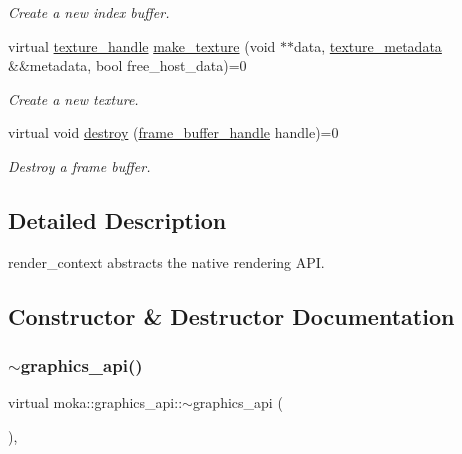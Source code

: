\begin{DoxyCompactItemize}
\begin{DoxyCompactList}\small\item\em Create a new index buffer. \end{DoxyCompactList}\item 
virtual \mbox{\hyperlink{structmoka_1_1texture__handle}{texture\+\_\+handle}} \mbox{\hyperlink{classmoka_1_1graphics__api_a61417bde89d91f8ec436e54226339b88}{make\+\_\+texture}} (void $\ast$$\ast$data, \mbox{\hyperlink{structmoka_1_1texture__metadata}{texture\+\_\+metadata}} \&\&metadata, bool free\+\_\+host\+\_\+data)=0
\begin{DoxyCompactList}\small\item\em Create a new texture. \end{DoxyCompactList}\item 
virtual void \mbox{\hyperlink{classmoka_1_1graphics__api_a493d46d804ed3dcbe6e9b8bd20d5bb6f}{destroy}} (\mbox{\hyperlink{structmoka_1_1frame__buffer__handle}{frame\+\_\+buffer\+\_\+handle}} handle)=0
\begin{DoxyCompactList}\small\item\em Destroy a frame buffer. \end{DoxyCompactList}\end{DoxyCompactItemize}


\subsection{Detailed Description}
render\+\_\+context abstracts the native rendering A\+PI. 

\subsection{Constructor \& Destructor Documentation}
\mbox{\label{classmoka_1_1graphics__api_abd54303be7fb42a6d85092ebee5b605e}} 
\subsubsection{\texorpdfstring{$\sim$graphics\_api()}{~graphics\_api()}}
{\footnotesize\ttfamily virtual moka\+::graphics\+\_\+api\+::$\sim$graphics\+\_\+api (\begin{DoxyParamCaption}{ }\end{DoxyParamCaption})\hspace{0.3cm}{\ttfamily [virtual]}, {\ttfamily [default]}}

